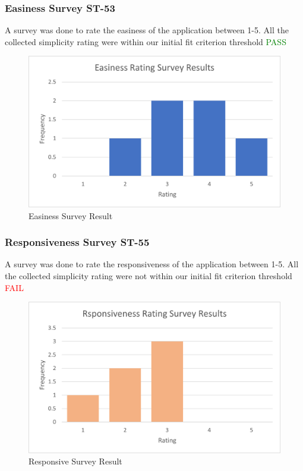 \documentclass[12pt, titlepage]{article}
\begin{document}
	\subsubsection{Easiness Survey ST-53}
	A survey was done to rate the easiness of the application between 1-5. All the collected simplicity rating were within our initial fit criterion threshold \textcolor{green}{PASS}
	\begin{figure}[H]
		\centering
		\includegraphics[]{easiness}
		\caption{Easiness Survey Result}
	\end{figure}
	
	\subsubsection{Responsiveness Survey ST-55}
	A survey was done to rate the responsiveness of the application between 1-5. All the collected simplicity rating were not within our initial fit criterion threshold \textcolor{red}{FAIL}
	\begin{figure}[H]
		\centering
		\includegraphics[]{responsiveness}
		\caption{Responsive Survey Result}
	\end{figure}
	
\end{document}
